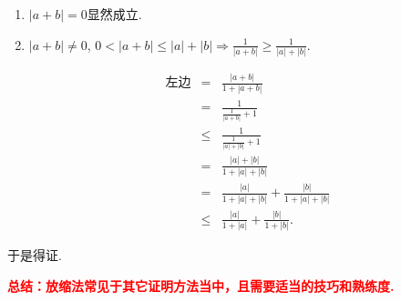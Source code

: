 \documentclass[8pt]{article}
\begin{document}
					\begin{enumerate}[label=$\arabic*^{\circ}$]
						\item $|a+b|=0$显然成立.
						\item $|a+b| \neq 0$, $0<|a+b|\leq|a|+|b| \Rightarrow \displaystyle \frac{1}{|a+b|}\geq\frac{1}{|a|+|b|}.$

							$$
							\begin{array}{rcl}
								\text{左边}&=&\displaystyle \frac{|a+b|}{1+|a+b|}\\
								&=&\displaystyle \frac{1}{\frac{1}{|a+b|}+1}\\
								&\leq&\displaystyle \frac{1}{\frac{1}{|a|+|b|}+1}\\
								&=&\displaystyle \frac{|a|+|b|}{1+|a|+|b|}\\
								&=&\displaystyle \frac{|a|}{1+|a|+|b|} + \frac{|b|}{1+|a|+|b|}\\
								&\leq&\displaystyle \frac{|a|}{1+|a|}+\frac{|b|}{1+|b|}.
							\end{array}
							$$
					\end{enumerate}

					于是得证.

					\textcolor{red}{\textbf{总结：放缩法常见于其它证明方法当中，且需要适当的技巧和熟练度.}}
\end{document}
